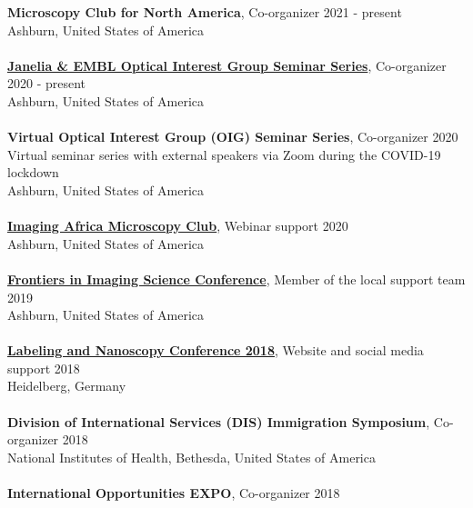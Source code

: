 \documentclass[margin,line]{res}
\begin{document}
\begin{resume}
{\bf Microscopy Club for North America}, Co-organizer \hfill {2021 - present}\\
Ashburn, United States of America\\
\vspace*{-3mm}\\
{\bf \href{https://www.janelia.org/content/optical-interest-group}{Janelia \& EMBL Optical Interest  Group Seminar Series}}, Co-organizer \hfill {2020 - present}\\
Ashburn, United States of America\\
\vspace*{-3mm}\\
{\bf Virtual Optical Interest Group (OIG) Seminar Series}, Co-organizer \hfill {2020}\\
Virtual seminar series with external speakers via Zoom during the COVID-19 lockdown\\
Ashburn, United States of America\\
\vspace*{-3mm}\\
{\bf \href{https://www.imagingafrica.org/}{Imaging Africa Microscopy Club}}, Webinar support \hfill {2020}\\
Ashburn, United States of America\\
\vspace*{-3mm}\\
{\bf \href{https://www.janelia.org/you-janelia/conferences/frontiers-in-imaging-science-ii}{ Frontiers in Imaging Science Conference}}, Member of the local support team \hfill {2019}\\
Ashburn, United States of America\\
\vspace*{-3mm}\\
{\bf \href{https://labeling-and-nanoscopy.de/}{Labeling and Nanoscopy Conference 2018}}, Website and social media support \hfill {2018}\\
Heidelberg, Germany\\
\vspace*{-3mm}\\
{\bf Division of International Services (DIS) Immigration Symposium}, Co-organizer  \hfill {2018}\\
National Institutes of Health, Bethesda, United States of America\\
\vspace*{-3mm}\\
{\bf International Opportunities EXPO}, Co-organizer \hfill {2018}\\

\end{resume}
\end{document}
